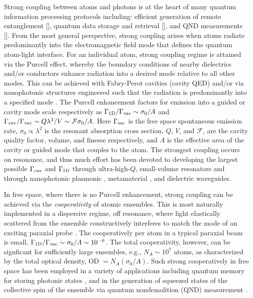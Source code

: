 \documentclass[preprint, aps,pra,onecolumn]{revtex4-1} %
\newcommand{\oneD}{{\rm 1D}}
\newcommand{\vac}{{\rm vac}}
\newcommand{\cav}{{\rm cav}}
\begin{document}
Strong coupling between atoms and photons %
is at the heart of many quantum information processing protocols including: efficient generation of remote entanglement [], quantum data storage and retrieval [], and QND measurements [].  
From the most general perspective, strong coupling arises when atoms radiate predominantly into the electromagnetic field mode that defines the quantum atom-light interface.  
For an individual atom, strong coupling regime is attained via the Purcell effect, whereby the boundary conditions of nearby dielectrics and/or conductors enhance radiation into a desired mode relative to all other modes.  
This can be achieved with Fabry-Perot cavities (cavity QED) \cite{miller_trapped_2005} and/or via nanophotonic structures engineered such that the radiation is predominantly into a specified mode \cite{manga_rao_single_2007, hakuta_manipulating_2012, hung_trapped_2013}.  
The Purcell enhancement factors for emission into a guided or cavity mode scale respectively as  $ \Gamma_{\oneD}/\Gamma_{\vac} \sim \sigma_0/A$ and  
$\Gamma_{\cav}/\Gamma_{\vac} \sim   Q \lambda^3/V \sim \mathcal{F}  \sigma_0/A$.  
Here $\Gamma_{\vac}$ is the free space spontaneous emission rate, $\sigma_0 \propto \lambda^2$ is the resonant absorption cross section, $Q$, $V$, and $\mathcal{F}$,  are the cavity quality factor, volume, and finesse respectively, and $A$ is the effective area of the cavity or guided mode that couples to the atom.  
The strongest coupling occurs on resonance, and thus much effort has been devoted to developing the largest possible $\Gamma_{\cav}$ and $\Gamma_{\oneD}$ through ultra-high-$Q$, small-volume resonators \cite{raimond_manipulating_2001, wallraff_strong_2004, miller_trapped_2005} and through nanophotonic plasmonic \cite{dzsotjan_quantum_2010, tame_quantum_2013}, metamaterial \cite{yao_ultrahigh_2009}, and dielectric \cite{hung_trapped_2013, goban_atomlight_2014} waveguides.   

In free space, where there is no Purcell enhancement, strong coupling can be achieved via the {\em cooperativity} of atomic ensembles.  
This is most naturally implemented in a dispersive regime, off resonance, where light elastically scattered from the ensemble constructively interferes to match the mode of an exciting paraxial probe \cite{baragiola_three-dimensional_2014}.  
The cooperatively per atom in a typical paraxial beam is small, $\Gamma_{\oneD}/\Gamma_{\vac} \sim \sigma_0/A  \sim 10^{-6}$.  
The total cooperativity, however, can be signficant for sufficiently large ensembles, e.g., $N_A \sim  10^7$ atoms, as characterized by the total optical density, OD $= N_A (\sigma_0/A)$.  
Such strong cooperatively in free space has been employed in a variety of applications including quantum memory for storing photonic states  \cite{?}, and in the generation of squeezed states of the collective spin of the ensemble via quantum nondemolition (QND) measurement \cite{?}.   
\end{document}
